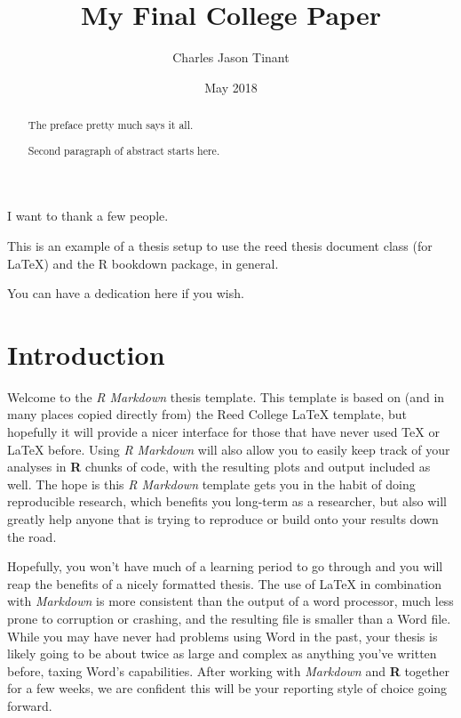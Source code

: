 \documentclass[12pt,twoside]{reedthesis}
\title{My Final College Paper}
\author{Charles Jason Tinant}
\date{May 2018}
\theoremstyle{definition}
\theoremstyle{definition}
\theoremstyle{definition}
\theoremstyle{remark}
\begin{document}
  \maketitle

\frontmatter %
\pagestyle{empty} %
  \begin{acknowledgements}
    I want to thank a few people.
  \end{acknowledgements}
  \begin{preface}
    This is an example of a thesis setup to use the reed thesis document
    class (for LaTeX) and the R bookdown package, in general.
  \end{preface}
  \hypersetup{linkcolor=black}
  \setcounter{tocdepth}{2}
  \tableofcontents

  \listoftables

  \listoffigures
  \begin{abstract}
    The preface pretty much says it all. \par
    
    Second paragraph of abstract starts here.
  \end{abstract}
  \begin{dedication}
    You can have a dedication here if you wish.
  \end{dedication}
\mainmatter %
\pagestyle{fancyplain} %

\chapter*{Introduction}\label{introduction}

Welcome to the \emph{R Markdown} thesis template. This template is based
on (and in many places copied directly from) the Reed College LaTeX
template, but hopefully it will provide a nicer interface for those that
have never used TeX or LaTeX before. Using \emph{R Markdown} will also
allow you to easily keep track of your analyses in \textbf{R} chunks of
code, with the resulting plots and output included as well. The hope is
this \emph{R Markdown} template gets you in the habit of doing
reproducible research, which benefits you long-term as a researcher, but
also will greatly help anyone that is trying to reproduce or build onto
your results down the road.

Hopefully, you won't have much of a learning period to go through and
you will reap the benefits of a nicely formatted thesis. The use of
LaTeX in combination with \emph{Markdown} is more consistent than the
output of a word processor, much less prone to corruption or crashing,
and the resulting file is smaller than a Word file. While you may have
never had problems using Word in the past, your thesis is likely going
to be about twice as large and complex as anything you've written
before, taxing Word's capabilities. After working with \emph{Markdown}
and \textbf{R} together for a few weeks, we are confident this will be
your reporting style of choice going forward.
\end{document}
